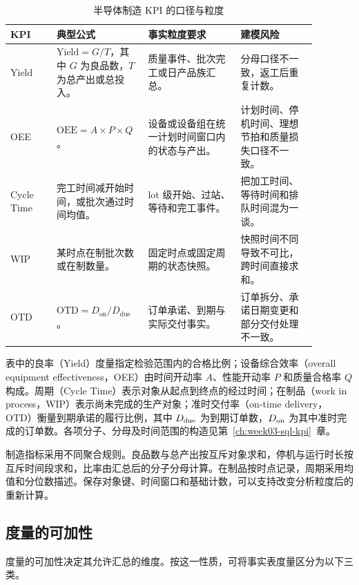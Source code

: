 \begin{table}[htbp]
\centering
\caption{半导体制造 KPI 的口径与粒度}
\begin{tabular}{P{0.14\linewidth}P{0.23\linewidth}P{0.28\linewidth}P{0.23\linewidth}}
\toprule
{}
KPI & 典型公式 & 事实粒度要求 & 建模风险\\
\midrule

Yield & \(\mathrm{Yield}=G/T\)，其中 \(G\) 为良品数，\(T\) 为总产出或总投入。 & 质量事件、批次完工或日产品族汇总。 & 分母口径不一致，返工后重复计数。\\
OEE & \(\mathrm{OEE}=A\times P\times Q\)。 & 设备或设备组在统一计划时间窗口内的状态与产出。 & 计划时间、停机时间、理想节拍和质量损失口径不一致。\\
Cycle Time & 完工时间减开始时间，或批次通过时间均值。 & lot 级开始、过站、等待和完工事件。 & 把加工时间、等待时间和排队时间混为一谈。\\
WIP & 某时点在制批次数或在制数量。 & 固定时点或固定周期的状态快照。 & 快照时间不同导致不可比，跨时间直接求和。\\
OTD & \(\mathrm{OTD}=D_{\mathrm{on}}/D_{\mathrm{due}}\)。 & 订单承诺、到期与实际交付事实。 & 订单拆分、承诺日期变更和部分交付处理不一致。\\
\bottomrule
\end{tabular}
\end{table}

表中的良率（Yield）度量指定检验范围内的合格比例；设备综合效率（overall equipment effectiveness，OEE）由时间开动率 \(A\)、性能开动率 \(P\) 和质量合格率 \(Q\) 构成。周期（Cycle Time）表示对象从起点到终点的经过时间；在制品（work in process，WIP）表示尚未完成的生产对象；准时交付率（on-time delivery，OTD）衡量到期承诺的履行比例，其中 \(D_{\rm due}\) 为到期订单数，\(D_{\rm on}\) 为其中准时完成的订单数。各项分子、分母及时间范围的构造见第~\ref{ch:week03-sql-kpi}~章。

制造指标采用不同聚合规则。良品数与总产出按互斥对象求和，停机与运行时长按互斥时间段求和，比率由汇总后的分子分母计算。在制品按时点记录，周期采用均值和分位数描述。保存对象键、时间窗口和基础计数，可以支持改变分析粒度后的重新计算。

\subsection{度量的可加性}

度量的可加性决定其允许汇总的维度。按这一性质，可将事实表度量区分为以下三类。

